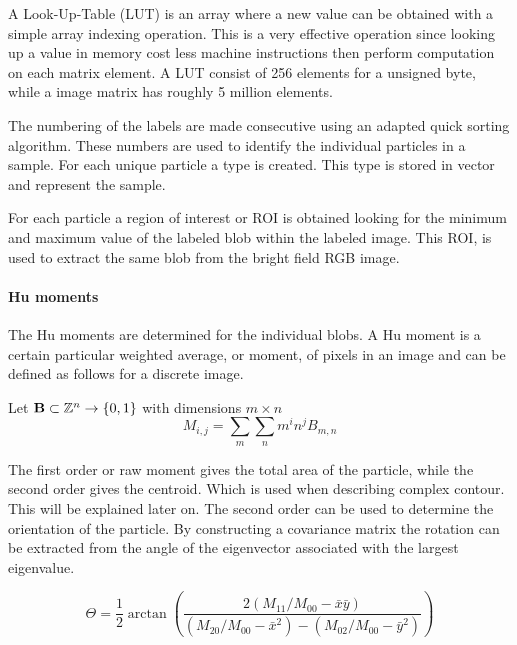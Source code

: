 \documentclass[11pt,fleqn,,a4paper,twoside,openright]{book}
\begin{document}
\begin{remark}
	A Look-Up-Table (LUT) is an array where a new value can be obtained with a simple array indexing operation. This is a very effective operation since looking up a value in memory cost less machine instructions then perform computation on each matrix element. A LUT consist of 256 elements for a unsigned byte, while a image matrix has roughly 5 million elements. 
\end{remark}

The numbering of the labels are made consecutive using an adapted quick sorting algorithm. These numbers are used to identify the individual particles in a sample. For each unique particle a type is created. This type is stored in vector and represent the sample. 

For each particle a region of interest or ROI is obtained looking for the minimum and maximum value of the labeled blob within the labeled image. This ROI, is used to extract the same blob from the bright field RGB image.

\paragraph{Hu moments}\label{Hu moments}
The Hu moments are determined for the individual blobs. A Hu moment is a certain particular weighted average, or moment, of pixels in an image and can be defined as follows for a discrete image.
\begin{sBox}
	Let $\mat{B} \subset \mathbb{Z}^n \rightarrow \{0, 1\}$ with dimensions $ m \times n $
	\begin{equation}\label{eq:humoment}
		M_{i,j}=\sum_m \sum_n m^i n^j B_{m,n}
	\end{equation}
\end{sBox}
The first order or raw moment gives the total area of the particle, while the second order gives the centroid. Which is used when describing complex contour. This will be explained later on. The second order can be used to determine the orientation of the particle. By constructing a covariance matrix the rotation can be extracted from the angle of the eigenvector associated with the largest eigenvalue.
\begin{sBox}
	\begin{equation}
	\Theta = \frac{1}{2} \arctan \left( \frac{2 (M_{11}/M_{00} - \bar{x}\bar{y})}{(M_{20}/M_{00} - \bar{x}^2) - (M_{02}/M_{00} - \bar{y}^2)} \right)
	\end{equation}
\end{sBox}
\end{document}
